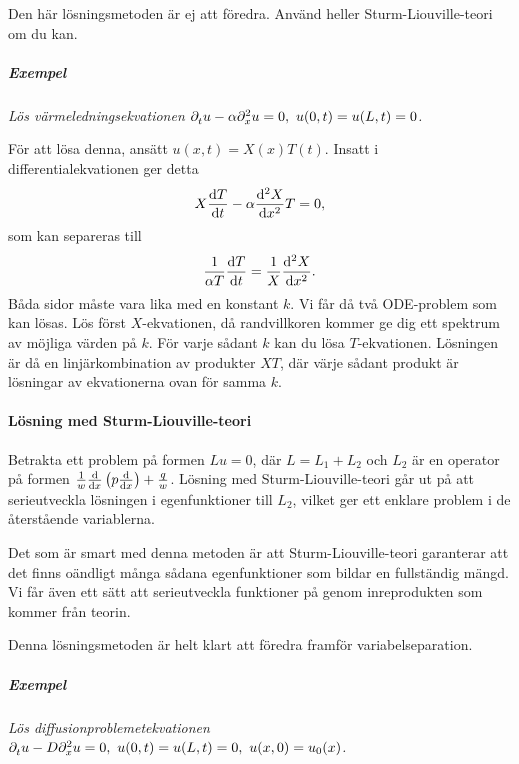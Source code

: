 Den här lösningsmetoden är ej att föredra. Använd heller Sturm-Liouville-teori om du kan.

\subparagraph{Exempel}
\textit{
Lös värmeledningsekvationen $\del{t}u - \alpha\del[2]{x}u = 0,\ u(0, t) = u(L, t) = 0$.
}

För att lösa denna, ansätt $u(x, t) = X(x)T(t)$. Insatt i differentialekvationen ger detta
\begin{align*}
	X\dv{T}{t} - \alpha\dv[2]{X}{x}T = 0,
\end{align*}
som kan separeras till
\begin{align*}
	\frac{1}{\alpha T}\dv{T}{t} = \frac{1}{X}\dv[2]{X}{x}.
\end{align*}
Båda sidor måste vara lika med en konstant $k$. Vi får då två ODE-problem som kan lösas. Lös först $X$-ekvationen, då randvillkoren kommer ge dig ett spektrum av möjliga värden på $k$. För varje sådant $k$ kan du lösa $T$-ekvationen. Lösningen är då en linjärkombination av produkter $XT$, där värje sådant produkt är lösningar av ekvationerna ovan för samma $k$.

\paragraph{Lösning med Sturm-Liouville-teori}
Betrakta ett problem på formen $Lu = 0$, där $L = L_{1} + L_{2}$ och $L_{2}$ är en operator på formen $\frac{1}{w}\dv{x}\left(p\dv{x}\right) + \frac{q}{w}$. Lösning med Sturm-Liouville-teori går ut på att serieutveckla lösningen i egenfunktioner till $L_{2}$, vilket ger ett enklare problem i de återstående variablerna.

Det som är smart med denna metoden är att Sturm-Liouville-teori garanterar att det finns oändligt många sådana egenfunktioner som bildar en fullständig mängd. Vi får även ett sätt att serieutveckla funktioner på genom inreprodukten som kommer från teorin.

Denna lösningsmetoden är helt klart att föredra framför variabelseparation.

\subparagraph{Exempel}
\textit{
Lös diffusionproblemetekvationen $\del{t}u - D\del[2]{x}u = 0,\ u(0, t) = u(L, t) = 0,\ u(x, 0) = u_{0}(x)$.
}

